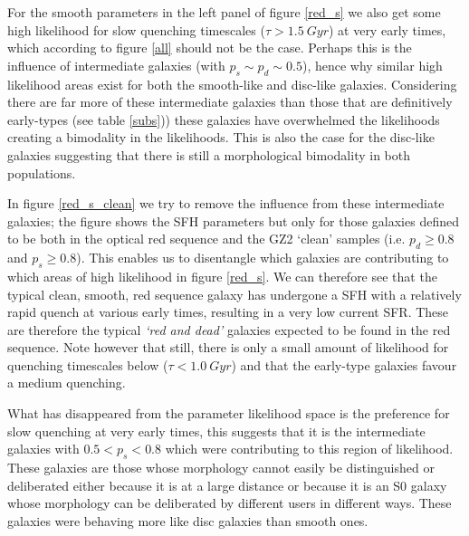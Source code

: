 \documentclass{mn2e}
\begin{document}
For the smooth parameters in the left panel of figure \ref{red_s} we also get some high likelihood for slow quenching timescales ($\tau > 1.5~Gyr$) at very early times, which according to figure \ref{all} should not be the case. Perhaps this is the influence of intermediate galaxies (with $p_s \sim p_d \sim 0.5$), hence why similar high likelihood areas exist for both the smooth-like and disc-like galaxies. Considering there are far more of these intermediate galaxies than those that are definitively early-types (see table \ref{subs})) these galaxies have overwhelmed the likelihoods creating a bimodality in the likelihoods. This is also the case for the disc-like galaxies suggesting that there is still a morphological bimodality in both populations.

In figure \ref{red_s_clean} we try to remove the influence from these intermediate galaxies; the figure shows the SFH parameters but only for those galaxies defined to be both in the optical red sequence and the GZ2 `clean' samples (i.e. $p_d \geq 0.8$ and $p_s \geq 0.8$). This enables us to disentangle which galaxies are contributing to which areas of high likelihood in figure \ref{red_s}. We can therefore see that the typical clean, smooth, red sequence galaxy has undergone a SFH with a relatively rapid quench at various early times, resulting in a very low current SFR. These are therefore the typical \emph{`red and dead'} galaxies expected to be found in the red sequence. Note however that still, there is only a small amount of likelihood for quenching timescales below ($\tau < 1.0~Gyr$) and that the early-type galaxies favour a medium quenching. 

What has disappeared from the parameter likelihood space is the preference for slow quenching at very early times, this suggests that it is the intermediate galaxies with $0.5 < p_s < 0.8$ which were contributing to this region of likelihood. These galaxies are those whose morphology cannot easily be distinguished or deliberated either because it is at a large distance or because it is an S0 galaxy whose morphology can be deliberated by different users in different ways. These galaxies were behaving more like disc galaxies than smooth ones. 

\end{document}
